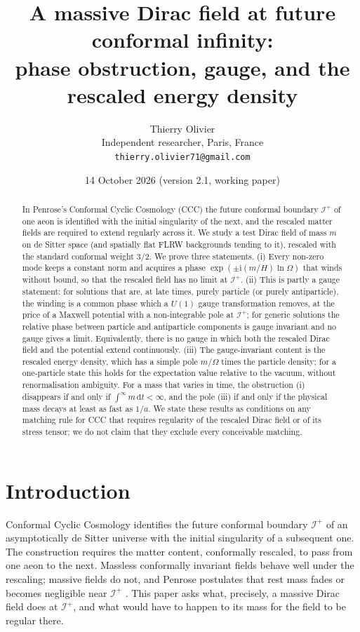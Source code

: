 \documentclass[11pt,a4paper]{article}
\title{\textbf{A massive Dirac field at future conformal infinity:\\ phase obstruction, gauge, and the rescaled energy density}}
\author{Thierry Olivier\\ \small Independent researcher, Paris, France\\ \small \texttt{thierry.olivier71@gmail.com}}
\date{14 October 2026 \quad (version 2.1, working paper)}
\theoremstyle{definition}
\newcommand{\scri}{\mathscr{I}^{+}}
\newcommand{\dd}{\mathrm{d}}
\newcommand{\ii}{\mathrm{i}}
\begin{document}
\maketitle

\begin{abstract}
In Penrose's Conformal Cyclic Cosmology (CCC) the future conformal boundary $\scri$ of one aeon is identified with the initial singularity of the next, and the rescaled matter fields are required to extend regularly across it. We study a test Dirac field of mass $m$ on de Sitter space (and spatially flat FLRW backgrounds tending to it), rescaled with the standard conformal weight $3/2$. We prove three statements. (i) Every non-zero mode keeps a constant norm and acquires a phase $\exp(\pm\ii(m/H)\ln\Omega)$ that winds without bound, so that the rescaled field has no limit at $\scri$. (ii) This is partly a gauge statement: for solutions that are, at late times, purely particle (or purely antiparticle), the winding is a common phase which a $U(1)$ gauge transformation removes, at the price of a Maxwell potential with a non-integrable pole at $\scri$; for generic solutions the relative phase between particle and antiparticle components is gauge invariant and no gauge gives a limit. Equivalently, there is no gauge in which both the rescaled Dirac field and the potential extend continuously. (iii) The gauge-invariant content is the rescaled energy density, which has a simple pole $m/\Omega$ times the particle density; for a one-particle state this holds for the expectation value relative to the vacuum, without renormalisation ambiguity. For a mass that varies in time, the obstruction (i) disappears if and only if $\int^\infty m\,\dd t<\infty$, and the pole (iii) if and only if the physical mass decays at least as fast as $1/a$. We state these results as conditions on any matching rule for CCC that requires regularity of the rescaled Dirac field or of its stress tensor; we do not claim that they exclude every conceivable matching.
\end{abstract}

\section{Introduction}

Conformal Cyclic Cosmology \cite{Penrose2010,Tod2013,MeissnerPenrose2025} identifies the future conformal boundary $\scri$ of an asymptotically de Sitter universe with the initial singularity of a subsequent one. The construction requires the matter content, conformally rescaled, to pass from one aeon to the next. Massless conformally invariant fields behave well under the rescaling; massive fields do not, and Penrose postulates that rest mass fades or becomes negligible near $\scri$ \cite{Penrose2010}. This paper asks what, precisely, a massive Dirac field does at $\scri$, and what would have to happen to its mass for the field to be regular there.
\end{document}
